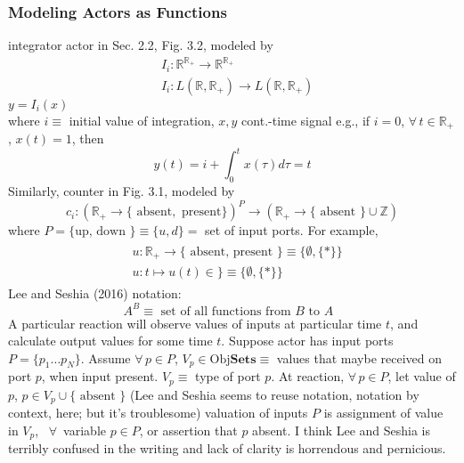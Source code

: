 \documentclass[10pt]{amsart}
\begin{document}
\begin{multicols*}{2}
\subsubsection{Modeling Actors as Functions}
integrator actor in Sec. 2.2, Fig. 3.2, modeled by 
\[
\begin{aligned}
& I_i : \mathbb{R}^{\mathbb{R}_+} \to \mathbb{R}^{\mathbb{R}_+} \\ 
&  I_i : L(\mathbb{R}, \mathbb{R}_+ ) \to L(\mathbb{R}, \mathbb{R}_+)
\end{aligned}
\]
$y= I_i(x)$  \\
where $i\equiv $ initial value of integration, $x,y$ cont.-time signal 
e.g., if $i=0$, $\forall \, t \in \mathbb{R}_+$, $x(t) = 1$, then 
\[
y(t) = i + \int_0^t x(\tau ) d\tau = t
\]
Similarly, counter in Fig. 3.1, modeled by 
\[
c_i : (\mathbb{R}_+ \to \lbrace \text{ absent} , \text{ present} \rbrace )^P \to (\mathbb{R}_+ \to \lbrace \text{ absent } \rbrace \cup \mathbb{Z})
\]
where $P = \lbrace \text{up, down } \rbrace \equiv \lbrace u ,d \rbrace = $ set of input ports.  
For example, 
\[
\begin{gathered}
\begin{aligned}
& u: \mathbb{R}_+ \to \lbrace \text{ absent, present } \rbrace \equiv \lbrace \emptyset , \lbrace * \rbrace \rbrace \\ 
& u: t \mapsto u(t) \in  \rbrace \equiv \lbrace \emptyset , \lbrace * \rbrace \rbrace 
\end{aligned}
\end{gathered}
\]
Lee and Seshia (2016) \cite{LeSe2016} notation: 
\[
A^B \equiv  \text{ set of all functions from $B$ to $A$ }
\]
A particular reaction will observe values of inputs at particular time $t$, and calculate output values for some time $t$.  
Suppose actor has input ports $P = \lbrace p_1 \dots p_N \rbrace$.  
Assume $\forall \, p \in P$, $V_p \in \text{Obj} \textbf{Sets} \equiv $ values that maybe received on port $p$, when input present.  
$V_p \equiv $ type of port $p$.  
At reaction, $\forall \, p \in P$, let value of $p$, $p\in V_p \cup \lbrace \text{ absent } \rbrace$ (Lee and Seshia seems to reuse notation, notation by context, here; but it's troublesome)
valuation of inputs $P$ is assignment of value in $V_p$, \, $\forall \, $ variable $p\in P$, or assertion that $p $ absent.  
I think Lee and Seshia is terribly confused in the writing and lack of clarity is horrendous and pernicious.  

\end{multicols*}
\end{document}
